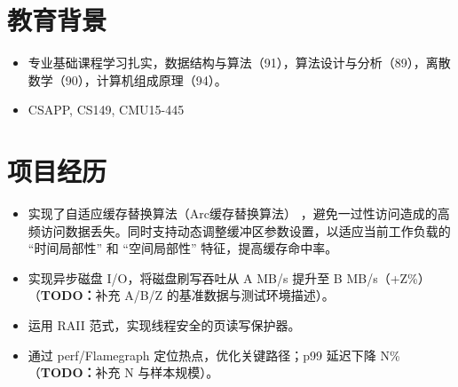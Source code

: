 \documentclass{resume}
\begin{document}




\sepspace
{}


\section{教育背景}
\begin{itemize}
  \item 专业基础课程学习扎实，数据结构与算法（91），算法设计与分析（89），离散数学（90），计算机组成原理（94）。 
  \item CSAPP, CS149, CMU15-445
\end{itemize}

\section{项目经历}
\begin{itemize}
  \item 实现了自适应缓存替换算法（Arc缓存替换算法） ，避免一过性访问造成的高频访问数据丢失。同时支持动态调整缓冲区参数设置，以适应当前工作负载的 “时间局部性” 和 “空间局部性” 特征，提高缓存命中率。
  \item 实现异步磁盘 I/O，将磁盘刷写吞吐从 A MB/s 提升至 B MB/s（+Z\%）（\textbf{TODO：}补充 A/B/Z 的基准数据与测试环境描述）。
  \item 运用 RAII 范式，实现线程安全的页读写保护器。
  \item 通过 {perf}/Flamegraph 定位热点，优化关键路径；p99 延迟下降 N\%（\textbf{TODO：}补充 N 与样本规模）。
\end{itemize}
\end{document}
